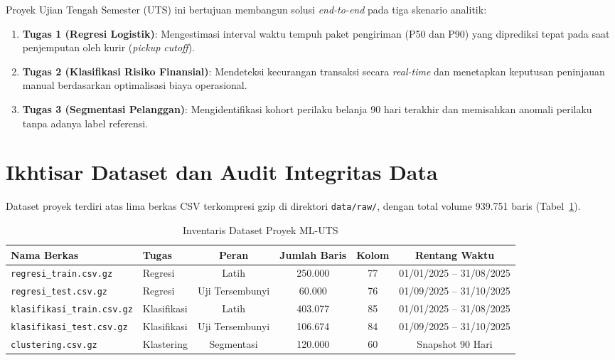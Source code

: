\documentclass[11pt,a4paper]{article}
\begin{document}
Proyek Ujian Tengah Semester (UTS) ini bertujuan membangun solusi \textit{end-to-end} pada tiga skenario analitik:
\begin{enumerate}
    \item \textbf{Tugas 1 (Regresi Logistik)}: Mengestimasi interval waktu tempuh paket pengiriman (P50 dan P90) yang diprediksi tepat pada saat penjemputan oleh kurir (\textit{pickup cutoff}).
    \item \textbf{Tugas 2 (Klasifikasi Risiko Finansial)}: Mendeteksi kecurangan transaksi secara \textit{real-time} dan menetapkan keputusan peninjauan manual berdasarkan optimalisasi biaya operasional.
    \item \textbf{Tugas 3 (Segmentasi Pelanggan)}: Mengidentifikasi kohort perilaku belanja 90 hari terakhir dan memisahkan anomali perilaku tanpa adanya label referensi.
\end{enumerate}

\section{Ikhtisar Dataset dan Audit Integritas Data}
Dataset proyek terdiri atas lima berkas CSV terkompresi gzip di direktori \texttt{data/raw/}, dengan total volume 939.751 baris (Tabel~\ref{tab:inventory}).

\begin{table}[h!]
\centering
\small
\caption{Inventaris Dataset Proyek ML-UTS}
\label{tab:inventory}
\begin{tabular}{llcccc}
\toprule
\textbf{Nama Berkas} & \textbf{Tugas} & \textbf{Peran} & \textbf{Jumlah Baris} & \textbf{Kolom} & \textbf{Rentang Waktu} \\
\midrule
\texttt{regresi\_train.csv.gz} & Regresi & Latih & 250.000 & 77 & 01/01/2025 -- 31/08/2025 \\
\texttt{regresi\_test.csv.gz} & Regresi & Uji Tersembunyi & 60.000 & 76 & 01/09/2025 -- 31/10/2025 \\
\texttt{klasifikasi\_train.csv.gz} & Klasifikasi & Latih & 403.077 & 85 & 01/01/2025 -- 31/08/2025 \\
\texttt{klasifikasi\_test.csv.gz} & Klasifikasi & Uji Tersembunyi & 106.674 & 84 & 01/09/2025 -- 31/10/2025 \\
\texttt{clustering.csv.gz} & Klastering & Segmentasi & 120.000 & 60 & Snapshot 90 Hari \\
\bottomrule
\end{tabular}
\end{table}
\end{document}
